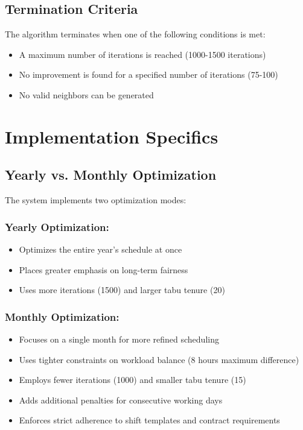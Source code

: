 \documentclass[12pt]{article}
\begin{document}
\subsection{Termination Criteria}

The algorithm terminates when one of the following conditions is met:
\begin{itemize}
    \item A maximum number of iterations is reached (1000-1500 iterations)
    \item No improvement is found for a specified number of iterations (75-100)
    \item No valid neighbors can be generated
\end{itemize}

\section{Implementation Specifics}

\subsection{Yearly vs. Monthly Optimization}

The system implements two optimization modes:

\subsubsection{Yearly Optimization:}
\begin{itemize}
    \item Optimizes the entire year's schedule at once
    \item Places greater emphasis on long-term fairness
    \item Uses more iterations (1500) and larger tabu tenure (20)
\end{itemize}

\subsubsection{Monthly Optimization:}
\begin{itemize}
    \item Focuses on a single month for more refined scheduling
    \item Uses tighter constraints on workload balance (8 hours maximum difference)
    \item Employs fewer iterations (1000) and smaller tabu tenure (15)
    \item Adds additional penalties for consecutive working days
    \item Enforces strict adherence to shift templates and contract requirements
\end{itemize}
\end{document}
